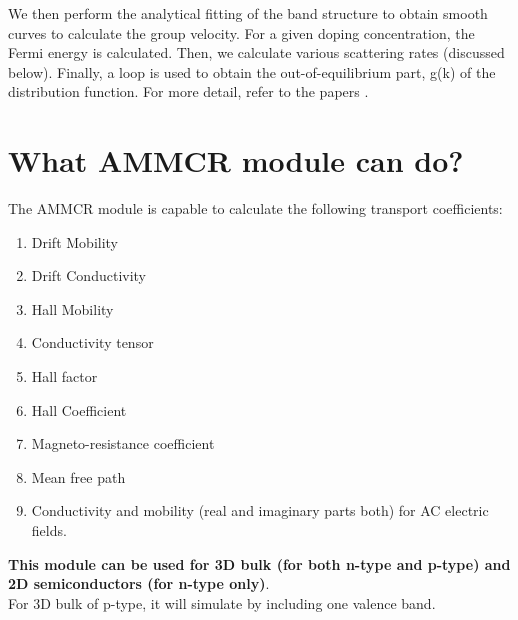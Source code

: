 \documentclass[12pt]{article}
\begin{document}
We then perform the analytical fitting of the band structure to obtain smooth curves to calculate the group velocity. For a given doping concentration, the Fermi energy is calculated. Then, we calculate various scattering rates (discussed below). Finally, a loop is used to obtain the out-of-equilibrium part, g(k) of the distribution function. For more detail, refer to the papers \cite{anup1,anup2,anup3}.

\section{What AMMCR module can do?} \label{capability}
The AMMCR module is capable to calculate the following transport coefficients:

\begin{enumerate}
    \item Drift Mobility
    \item Drift Conductivity
    \item Hall Mobility
    \item Conductivity tensor
    \item Hall factor
    \item Hall Coefficient
    \item Magneto-resistance coefficient
    \item Mean free path
    \item Conductivity and mobility (real and imaginary parts both) for AC electric fields.
\end{enumerate}


\textbf{This module can be used for 3D bulk (for both n-type and p-type) and 2D semiconductors (for n-type only)}.
\\
For 3D bulk of p-type, it will simulate by including one valence band. \\ \\
\end{document}
